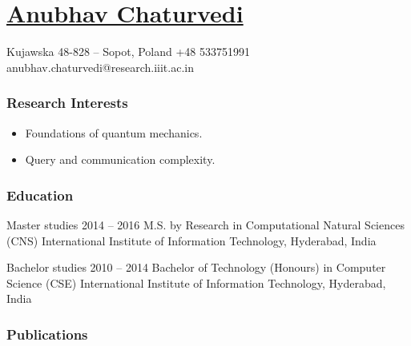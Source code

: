 \documentclass{tccv}
\begin{document}
\part{\href{https://scholar.google.ca/citations?view_op=list_works&hl=en&user=WHhfJSMAAAAJ}{Anubhav Chaturvedi}}

\personal
    {Kujawska 48-828 -- Sopot, Poland}
    {+48 533751991}
    {anubhav.chaturvedi@research.iiit.ac.in}

\section{Research Interests}
\begin{itemize} \itemsep -0pt %
\item Foundations of quantum mechanics.
\item Query and communication complexity.
\end{itemize}




\section{Education}

\begin{yearlist}
\item[Master studies]{2014 -- 2016}
     {M.S. by Research in Computational Natural Sciences (CNS)}
     {International Institute of Information Technology, Hyderabad, India}

\item[Bachelor studies]{2010 -- 2014}
     {Bachelor of Technology (Honours) in Computer Science (CSE)}
     {International Institute of Information Technology, Hyderabad, India}
\end{yearlist}

\section{Publications}
\end{document}
